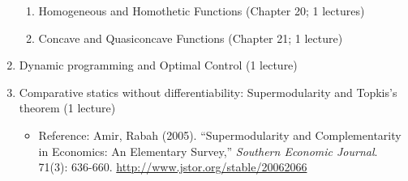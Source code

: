 \documentclass[10pt]{article}
\begin{document}
\begin{enumerate}
\begin{enumerate}
  \item Homogeneous and Homothetic Functions (Chapter 20; 1 lectures)
  \item Concave and Quasiconcave Functions (Chapter 21; 1 lecture)
  \end{enumerate}
\item Dynamic programming and Optimal Control (1 lecture) 
\item Comparative statics without differentiability: Supermodularity
  and Topkis's theorem (1 lecture)
  \begin{itemize}
  \item Reference: Amir, Rabah (2005). ``Supermodularity and
    Complementarity in Economics: An Elementary Survey,''
    \textit{Southern Economic Journal}. 71(3):
    636-660. \url{http://www.jstor.org/stable/20062066}
  \end{itemize}
\end{enumerate}
\end{document}
